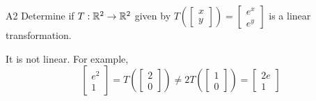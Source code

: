 \documentclass{sbgLAexam}
\begin{document}
\begin{problem}{A2} 
 Determine if $T: \mathbb{R}^2 \rightarrow \mathbb{R}^2$ given by $T\left(\begin{bmatrix} x \\ y \end{bmatrix}\right) = \begin{bmatrix} e^{x} \\ e^y \end{bmatrix}$ is a linear transformation.
\end{problem}
\begin{solution}
It is not linear.  For example, $$\begin{bmatrix}e^2 \\ 1 \end{bmatrix} = T\left(\begin{bmatrix} 2 \\ 0 \end{bmatrix} \right) \neq 2 T\left(\begin{bmatrix} 1 \\ 0 \end{bmatrix}\right)=\begin{bmatrix} 2e \\ 1 \end{bmatrix}$$
\end{solution}
\end{document}
